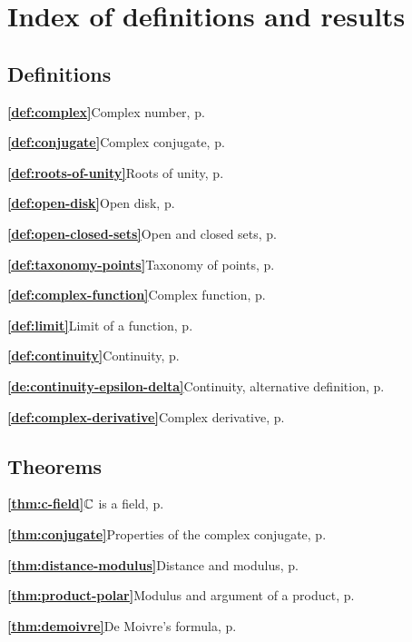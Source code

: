 \chapter*{Index of definitions and results}
\section*{Definitions}
\textbf{\ref{def:complex}}\quad Complex number, p.~\pageref{def:complex}

\textbf{\ref{def:conjugate}}\quad Complex conjugate, p.~\pageref{def:conjugate}

\textbf{\ref{def:roots-of-unity}}\quad Roots of unity, p.~\pageref{def:roots-of-unity}

\textbf{\ref{def:open-disk}}\quad Open disk, p.~\pageref{def:open-disk}

\textbf{\ref{def:open-closed-sets}}\quad Open and closed sets, p.~\pageref{def:open-closed-sets}

\textbf{\ref{def:taxonomy-points}}\quad Taxonomy of points, p.~\pageref{def:taxonomy-points}

\textbf{\ref{def:complex-function}}\quad Complex function, p.~\pageref{def:complex-function}

\textbf{\ref{def:limit}}\quad Limit of a function, p.~\pageref{def:limit}

\textbf{\ref{def:continuity}}\quad Continuity, p.~\pageref{def:continuity}

\textbf{\ref{de:continuity-epsilon-delta}}\quad Continuity, alternative definition, p.~\pageref{de:continuity-epsilon-delta}

\textbf{\ref{def:complex-derivative}}\quad Complex derivative, p.~\pageref{def:complex-derivative}

\section*{Theorems}
\textbf{\ref{thm:c-field}}\quad \(\mathbb{C}\) is a field, p.~\pageref{thm:c-field}

\textbf{\ref{thm:conjugate}}\quad Properties of the complex conjugate, p.~\pageref{thm:conjugate}

\textbf{\ref{thm:distance-modulus}}\quad Distance and modulus, p.~\pageref{thm:distance-modulus}

\textbf{\ref{thm:product-polar}}\quad Modulus and argument of a product, p.~\pageref{thm:product-polar}

\textbf{\ref{thm:demoivre}}\quad De Moivre's formula, p.~\pageref{thm:demoivre}

